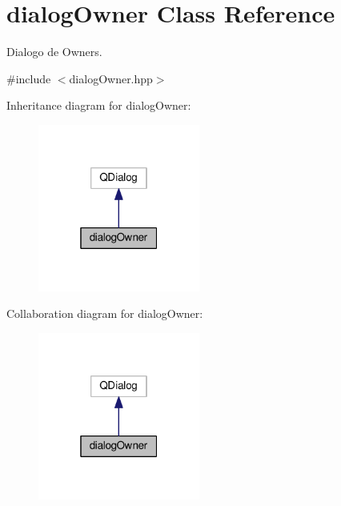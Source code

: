 \hypertarget{classdialogOwner}{}\section{dialog\+Owner Class Reference}
\label{classdialogOwner}


Dialogo de Owners.  




{\ttfamily \#include $<$dialog\+Owner.\+hpp$>$}



Inheritance diagram for dialog\+Owner\+:
\nopagebreak
\begin{figure}[H]
\begin{center}
\leavevmode
\includegraphics[width=151pt]{classdialogOwner__inherit__graph}
\end{center}
\end{figure}


Collaboration diagram for dialog\+Owner\+:
\nopagebreak
\begin{figure}[H]
\begin{center}
\leavevmode
\includegraphics[width=151pt]{classdialogOwner__coll__graph}
\end{center}
\end{figure}
